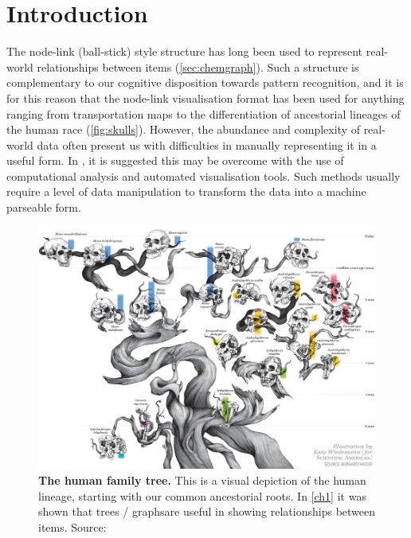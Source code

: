 

\section{Introduction}
The node-link (ball-stick) style structure has long been used to represent real-world relationships between items (\autoref{sec:chemgraph}). Such a structure is complementary to our cognitive disposition towards pattern recognition, and it is for this reason that the node-link visualisation format has been used for anything ranging from transportation maps \citep{beck} to the differentiation of ancestorial lineages of the human race (\autoref{fig:skulls}). However, the abundance and complexity of real-world data often present us with difficulties in manually representing it in a useful form. In \label{syntatic}, it is suggested this may be overcome with the use of computational analysis and automated visualisation tools. Such methods usually require a level of data manipulation to transform the data into a machine parseable form. 

\begin{figure}[H]
     \centering
         \includegraphics[width=\textwidth]{figures_c3/humanskulls.png}

        \caption[Caption for LOF]{\textbf{The human family tree.} This is a visual depiction of the human lineage, starting with our common ancestorial roots. In \autoref{ch1}  it was shown that trees / graphs\protect\footnotemark are useful in showing relationships between items. Source: \citep{skull}}
        \label{fig:skulls}
\end{figure}



